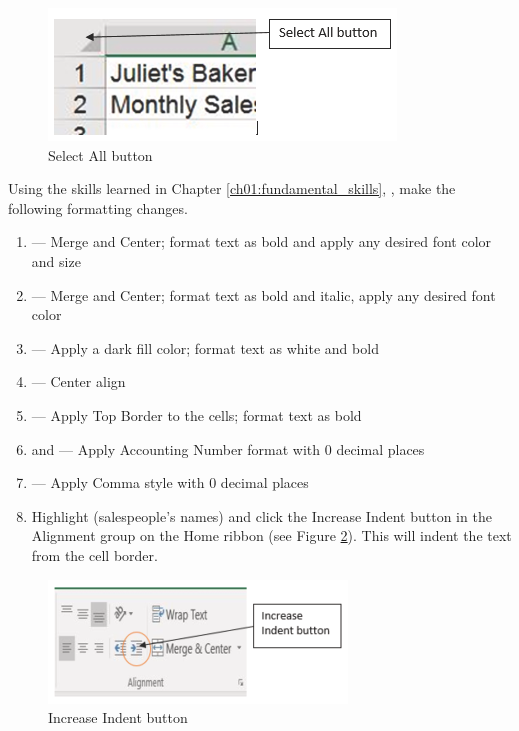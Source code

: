 \begin{figure}[H]
	\centering
	\includegraphics[width=\maxwidth{.95\linewidth}]{gfx/ch02_fig41}
	\caption{Select All button}
	\label{02:fig41}
\end{figure}

Using the skills learned in Chapter \ref{ch01:fundamental_skills}, , make the following formatting changes.

\begin{enumerate}
	\item {} --- Merge and Center; format text as bold and apply any desired font color and size
	\item {} --- Merge and Center; format text as bold and italic, apply any desired font color
	\item {} --- Apply a dark fill color; format text as white and bold
	\item {} --- Center align
	\item {} --- Apply Top Border to the cells; format text as bold
	\item {} and  --- Apply Accounting Number format with $ 0 $ decimal places
	\item {} --- Apply Comma style with $ 0 $ decimal places
	\item Highlight  (salespeople's names) and click the Increase Indent button in the Alignment group on the Home ribbon (see Figure \ref{02:fig42}). This will indent the text from the cell border.
\end{enumerate}

\begin{figure}[H]
	\centering
	\includegraphics[width=\maxwidth{.95\linewidth}]{gfx/ch02_fig42}
	\caption{Increase Indent button}
	\label{02:fig42}
\end{figure}

